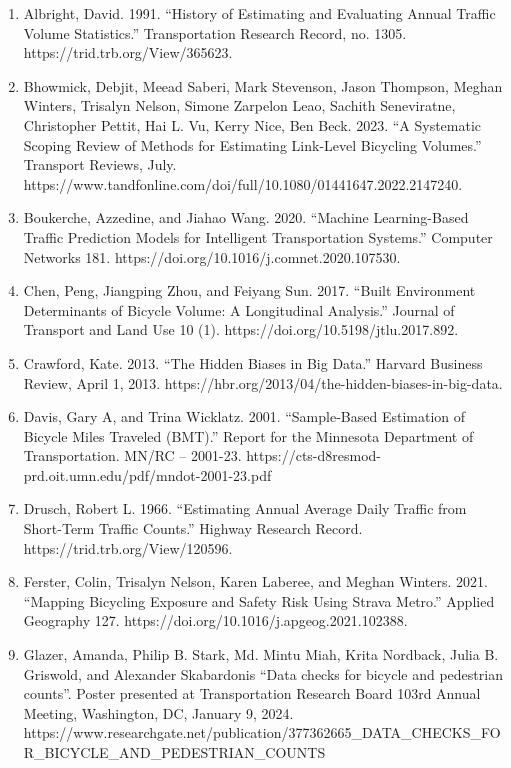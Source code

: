 \documentclass[11pt]{article}
\providecommand{\tightlist}{%
      \setlength{\itemsep}{0pt}\setlength{\parskip}{0pt}}
\begin{document}
\begin{enumerate}
\def\labelenumi{\arabic{enumi}.}
\tightlist
\item
  Albright, David. 1991. ``History of Estimating and Evaluating Annual
  Traffic Volume Statistics.'' Transportation Research Record, no. 1305.
  https://trid.trb.org/View/365623.
\item
  Bhowmick, Debjit, Meead Saberi, Mark Stevenson, Jason Thompson, Meghan
  Winters, Trisalyn Nelson, Simone Zarpelon Leao, Sachith Seneviratne,
  Christopher Pettit, Hai L. Vu, Kerry Nice, Ben Beck. 2023. ``A
  Systematic Scoping Review of Methods for Estimating Link-Level
  Bicycling Volumes.'' Transport Reviews, July.
  https://www.tandfonline.com/doi/full/10.1080/01441647.2022.2147240.
\item
  Boukerche, Azzedine, and Jiahao Wang. 2020. ``Machine Learning-Based
  Traffic Prediction Models for Intelligent Transportation Systems.''
  Computer Networks 181. https://doi.org/10.1016/j.comnet.2020.107530.
\item
  Chen, Peng, Jiangping Zhou, and Feiyang Sun. 2017. ``Built Environment
  Determinants of Bicycle Volume: A Longitudinal Analysis.'' Journal of
  Transport and Land Use 10 (1). https://doi.org/10.5198/jtlu.2017.892.
\item
  Crawford, Kate. 2013. ``The Hidden Biases in Big Data.'' Harvard
  Business Review, April 1, 2013.
  https://hbr.org/2013/04/the-hidden-biases-in-big-data.
\item
  Davis, Gary A, and Trina Wicklatz. 2001. ``Sample-Based Estimation of
  Bicycle Miles Traveled (BMT).'' Report for the Minnesota Department of
  Transportation. MN/RC -- 2001-23.
  https://cts-d8resmod-prd.oit.umn.edu/pdf/mndot-2001-23.pdf
\item
  Drusch, Robert L. 1966. ``Estimating Annual Average Daily Traffic from
  Short-Term Traffic Counts.'' Highway Research Record.
  https://trid.trb.org/View/120596.
\item
  Ferster, Colin, Trisalyn Nelson, Karen Laberee, and Meghan Winters.
  2021. ``Mapping Bicycling Exposure and Safety Risk Using Strava
  Metro.'' Applied Geography 127.
  https://doi.org/10.1016/j.apgeog.2021.102388.
\item
  Glazer, Amanda, Philip B. Stark, Md. Mintu Miah, Krita Nordback, Julia
  B. Griswold, and Alexander Skabardonis ``Data checks for bicycle and
  pedestrian counts''. Poster presented at Transportation Research Board
  103rd Annual Meeting, Washington, DC, January 9, 2024.
  https://www.researchgate.net/publication/377362665\_DATA\_CHECKS\_FOR\_BICYCLE\_AND\_PEDESTRIAN\_COUNTS

\end{enumerate}
\end{document}
